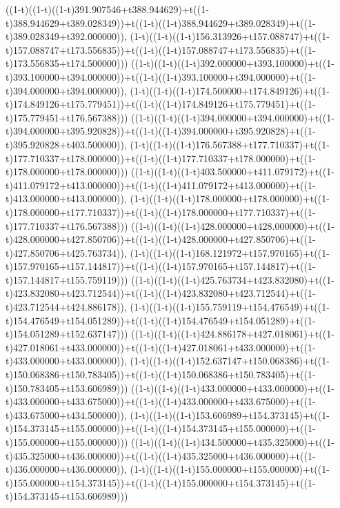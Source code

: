 ((1-t)((1-t)((1-t)391.907546+t388.944629)+t((1-t)388.944629+t389.028349))+t((1-t)((1-t)388.944629+t389.028349)+t((1-t)389.028349+t392.000000)),                                     (1-t)((1-t)((1-t)156.313926+t157.088747)+t((1-t)157.088747+t173.556835))+t((1-t)((1-t)157.088747+t173.556835)+t((1-t)173.556835+t174.500000)))
((1-t)((1-t)((1-t)392.000000+t393.100000)+t((1-t)393.100000+t394.000000))+t((1-t)((1-t)393.100000+t394.000000)+t((1-t)394.000000+t394.000000)),                                     (1-t)((1-t)((1-t)174.500000+t174.849126)+t((1-t)174.849126+t175.779451))+t((1-t)((1-t)174.849126+t175.779451)+t((1-t)175.779451+t176.567388)))
((1-t)((1-t)((1-t)394.000000+t394.000000)+t((1-t)394.000000+t395.920828))+t((1-t)((1-t)394.000000+t395.920828)+t((1-t)395.920828+t403.500000)),                                     (1-t)((1-t)((1-t)176.567388+t177.710337)+t((1-t)177.710337+t178.000000))+t((1-t)((1-t)177.710337+t178.000000)+t((1-t)178.000000+t178.000000)))
((1-t)((1-t)((1-t)403.500000+t411.079172)+t((1-t)411.079172+t413.000000))+t((1-t)((1-t)411.079172+t413.000000)+t((1-t)413.000000+t413.000000)),                                     (1-t)((1-t)((1-t)178.000000+t178.000000)+t((1-t)178.000000+t177.710337))+t((1-t)((1-t)178.000000+t177.710337)+t((1-t)177.710337+t176.567388)))
((1-t)((1-t)((1-t)428.000000+t428.000000)+t((1-t)428.000000+t427.850706))+t((1-t)((1-t)428.000000+t427.850706)+t((1-t)427.850706+t425.763734)),                                     (1-t)((1-t)((1-t)168.121972+t157.970165)+t((1-t)157.970165+t157.144817))+t((1-t)((1-t)157.970165+t157.144817)+t((1-t)157.144817+t155.759119)))
((1-t)((1-t)((1-t)425.763734+t423.832080)+t((1-t)423.832080+t423.712544))+t((1-t)((1-t)423.832080+t423.712544)+t((1-t)423.712544+t424.886178)),                                     (1-t)((1-t)((1-t)155.759119+t154.476549)+t((1-t)154.476549+t154.051289))+t((1-t)((1-t)154.476549+t154.051289)+t((1-t)154.051289+t152.637147)))
((1-t)((1-t)((1-t)424.886178+t427.018061)+t((1-t)427.018061+t433.000000))+t((1-t)((1-t)427.018061+t433.000000)+t((1-t)433.000000+t433.000000)),                                     (1-t)((1-t)((1-t)152.637147+t150.068386)+t((1-t)150.068386+t150.783405))+t((1-t)((1-t)150.068386+t150.783405)+t((1-t)150.783405+t153.606989)))
((1-t)((1-t)((1-t)433.000000+t433.000000)+t((1-t)433.000000+t433.675000))+t((1-t)((1-t)433.000000+t433.675000)+t((1-t)433.675000+t434.500000)),                                     (1-t)((1-t)((1-t)153.606989+t154.373145)+t((1-t)154.373145+t155.000000))+t((1-t)((1-t)154.373145+t155.000000)+t((1-t)155.000000+t155.000000)))
((1-t)((1-t)((1-t)434.500000+t435.325000)+t((1-t)435.325000+t436.000000))+t((1-t)((1-t)435.325000+t436.000000)+t((1-t)436.000000+t436.000000)),                                     (1-t)((1-t)((1-t)155.000000+t155.000000)+t((1-t)155.000000+t154.373145))+t((1-t)((1-t)155.000000+t154.373145)+t((1-t)154.373145+t153.606989)))
